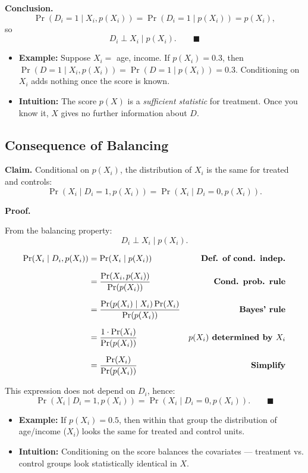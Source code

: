 \documentclass[12pt]{article}
\begin{document}
\textbf{Conclusion.}
\[
\Pr(D_i=1 \mid X_i, p(X_i)) = \Pr(D_i=1 \mid p(X_i)) = p(X_i),
\]
so
\[
D_i \perp X_i \mid p(X_i).
\qquad \blacksquare
\]

\begin{itemize}
    \item \textbf{Example:} Suppose $X_i=$ age, income. If $p(X_i)=0.3$, then $\Pr(D=1 \mid X_i, p(X_i))=\Pr(D=1 \mid p(X_i))=0.3$. Conditioning on $X_i$ adds nothing once the score is known.  
    \item \textbf{Intuition:} The score $p(X)$ is a \textit{sufficient statistic} for treatment. Once you know it, $X$ gives no further information about $D$.  
\end{itemize}

\subsection*{\noindent\textbf{Consequence of Balancing}}

\textbf{Claim.}  
Conditional on $p(X_i)$, the distribution of $X_i$ is the same for treated and controls:
\[
\Pr(X_i \mid D_i=1, p(X_i)) = \Pr(X_i \mid D_i=0, p(X_i)).
\]

\textbf{Proof.}

From the balancing property:
\[
D_i \perp X_i \mid p(X_i).
\]

\singlespacing
\begin{align}
\Pr(X_i \mid D_i, p(X_i)) 
  &= \Pr(X_i \mid p(X_i)) 
  & \text{\textbf{Def. of cond. indep.}} \\[6pt]
  &= \frac{\Pr(X_i, p(X_i))}{\Pr(p(X_i))} 
  & \text{\textbf{Cond. prob. rule}} \\[6pt]
  &= \frac{\Pr(p(X_i) \mid X_i)\Pr(X_i)}{\Pr(p(X_i))} 
  & \text{\textbf{Bayes’ rule}} \\[6pt]
  &= \frac{1 \cdot \Pr(X_i)}{\Pr(p(X_i))} 
  & \text{\textbf{$p(X_i)$ determined by $X_i$}} \\[6pt]
  &= \frac{\Pr(X_i)}{\Pr(p(X_i))} 
  & \text{\textbf{Simplify}}
\end{align}

This expression does not depend on $D_i$, hence:
\[
\Pr(X_i \mid D_i=1, p(X_i)) = \Pr(X_i \mid D_i=0, p(X_i)).
\qquad \blacksquare
\]

\begin{itemize}
    \item \textbf{Example:} If $p(X_i)=0.5$, then within that group the distribution of age/income ($X_i$) looks the same for treated and control units.  
    \item \textbf{Intuition:} Conditioning on the score balances the covariates — treatment vs. control groups look statistically identical in $X$.  
\end{itemize}
\end{document}
